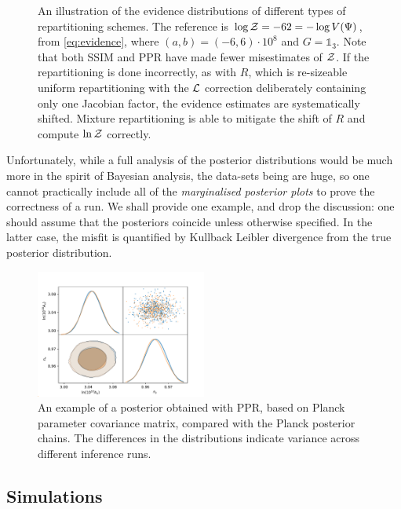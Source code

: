 \documentclass[usenatbib]{mnras}
\begin{document}
\begin{figure}

\caption{An illustration of the evidence distributions of different
  types of repartitioning schemes. The reference is
  \(\log {\cal Z} = -62 = - \log V(\Psi)\), from \cref{eq:evidence},
  where \((a,b)=(-6, 6)\cdot 10^{8}\) and \(G=\mathds{1}_{3}\). Note
  that both SSIM and PPR have made fewer misestimates of ${\cal
    Z}$. If the repartitioning is done incorrectly, as with $R$, which
  is re-sizeable uniform repartitioning with the ${\cal L}$ correction
  deliberately containing only one Jacobian factor, the evidence
  estimates are systematically shifted. Mixture repartitioning is able
  to mitigate the shift of $R$ and compute $\ln {\cal Z}$
  correctly.\label{fig:hist}}
\end{figure}

Unfortunately, while a full analysis of the posterior distributions
would be much more in the spirit of Bayesian analysis, the data-sets
being are huge, so one cannot practically include all of the
\emph{marginalised posterior plots} to prove the correctness of a
run. We shall provide one example, and drop the discussion: one should
assume that the posteriors coincide unless otherwise specified. In the
latter case, the misfit is quantified by Kullback Leibler divergence
from the true posterior distribution.


\begin{figure}
  \includegraphics[width=0.5\textwidth]{./illustrations/triangle-fit.pdf}
  \caption{An example of a posterior obtained with PPR, based on
    Planck parameter covariance matrix, compared with the Planck
    posterior chains. The differences in the distributions indicate
    variance across different inference
    runs. \label{fig:overlay-posteriors}}
\end{figure}


\subsection{Simulations}
\end{document}
